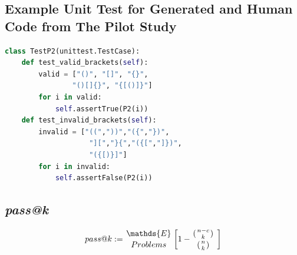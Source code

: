 \documentclass[manuscript,screen,review,sigconf]{acmart}
\newcommand\myatop[2]{{#1\atop#2}}
\begin{document}
\subsection{Example Unit Test for Generated and Human Code from The Pilot Study}
\begin{lstlisting}[language=Python]
class TestP2(unittest.TestCase):
    def test_valid_brackets(self):
        valid = ["()", "[]", "{}",
                "()[]{}", "{[()]}"]
        for i in valid:
            self.assertTrue(P2(i))
    def test_invalid_brackets(self):
        invalid = ["((","))","({","})",
                    "][","}{","({[","]})",
                    "({[)}]"]
        for i in invalid:
            self.assertFalse(P2(i))
\end{lstlisting}

\subsection{\textit{pass@k} \cite{CodexRelPaper}}

\[pass@k := \myatop{\mathds{E}}{Problems} \left[1-\myatop{(\myatop{n-c}{k})}{(\myatop{n}{k})}\ \right]\]
\end{document}
